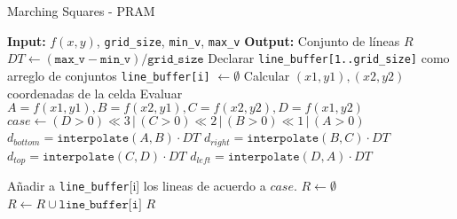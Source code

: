 \documentclass[12pt, A4]{article}
\begin{document}
%
%
\begin{algorithm}[H]
\footnotesize %
\caption{Marching Squares - PRAM}
\begin{algorithmic}[1]
\Statex \textbf{Input:} $f(x, y)$, \texttt{grid\_size}, \texttt{min\_v}, \texttt{max\_v}
\Statex \textbf{Output:} Conjunto de líneas $R$
\State $DT \gets (\texttt{max\_v} - \texttt{min\_v}) / \texttt{grid\_size}$
\State Declarar \texttt{line\_buffer[1..grid\_size]} como arreglo de conjuntos
 
    \State \texttt{line\_buffer[i]} $\gets \emptyset$    
        \State Calcular $(x1, y1), (x2, y2)$ coordenadas de la celda
        \State Evaluar $A = f(x1, y1), B = f(x2, y1), C = f(x2, y2), D = f(x1, y2)$
        \State $case \gets (D > 0) \ll 3 \,|\, (C > 0) \ll 2 \,|\, (B > 0) \ll 1 \,|\, (A > 0)$
        \State $d_{bottom} = \texttt{interpolate}(A, B) \cdot DT$
        \State $d_{right} = \texttt{interpolate}(B, C) \cdot DT$
        \State $d_{top} = \texttt{interpolate}(C, D) \cdot DT$
        \State $d_{left} = \texttt{interpolate}(D, A) \cdot DT$
        
        \State Añadir a \texttt{line\_buffer}[i] los lineas de acuerdo a $case$.     
    \EndFor
\EndParFor
\State $R \gets \emptyset$ 
    \State $R \gets R \cup \texttt{line\_buffer[i]}$
\EndFor
\State \Return $R$
\end{algorithmic}
\end{algorithm}
\end{document}
